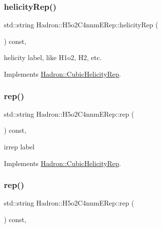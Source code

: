 \subsubsection{\texorpdfstring{helicityRep()}{helicityRep()}\hspace{0.1cm}{\footnotesize\ttfamily [3/3]}}
{\footnotesize\ttfamily std\+::string Hadron\+::\+H5o2\+C4nnm\+E\+Rep\+::helicity\+Rep (\begin{DoxyParamCaption}{ }\end{DoxyParamCaption}) const\hspace{0.3cm}{\ttfamily [inline]}, {\ttfamily [virtual]}}

helicity label, like H1o2, H2, etc. 

Implements \mbox{\hyperlink{structHadron_1_1CubicHelicityRep_af1096946b7470edf0a55451cc662f231}{Hadron\+::\+Cubic\+Helicity\+Rep}}.

\mbox{\label{structHadron_1_1H5o2C4nnmERep_abf60b976264ddcc15c9d98b220092085}} 
\subsubsection{\texorpdfstring{rep()}{rep()}\hspace{0.1cm}{\footnotesize\ttfamily [1/3]}}
{\footnotesize\ttfamily std\+::string Hadron\+::\+H5o2\+C4nnm\+E\+Rep\+::rep (\begin{DoxyParamCaption}{ }\end{DoxyParamCaption}) const\hspace{0.3cm}{\ttfamily [inline]}, {\ttfamily [virtual]}}

irrep label 

Implements \mbox{\hyperlink{structHadron_1_1CubicHelicityRep_a8cdd86f068a167dc96faef02bfb8a33d}{Hadron\+::\+Cubic\+Helicity\+Rep}}.

\mbox{\label{structHadron_1_1H5o2C4nnmERep_abf60b976264ddcc15c9d98b220092085}} 
\subsubsection{\texorpdfstring{rep()}{rep()}\hspace{0.1cm}{\footnotesize\ttfamily [2/3]}}
{\footnotesize\ttfamily std\+::string Hadron\+::\+H5o2\+C4nnm\+E\+Rep\+::rep (\begin{DoxyParamCaption}{ }\end{DoxyParamCaption}) const\hspace{0.3cm}{\ttfamily [inline]}, {\ttfamily [virtual]}}

